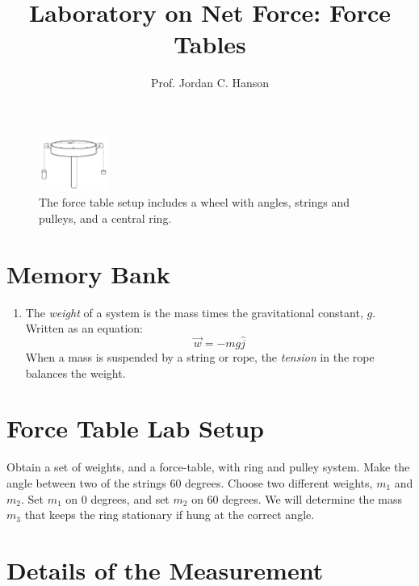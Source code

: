 \documentclass{article}
\begin{document}
\title{Laboratory on Net Force: Force Tables}
\author{Prof. Jordan C. Hanson}

\maketitle

\begin{figure}[ht]
\centering
\includegraphics[width=0.2\textwidth]{figures/Table.pdf}
\caption{\label{fig:table} The force table setup includes a wheel with angles, strings and pulleys, and a central ring.}
\end{figure}

\section{Memory Bank}

\begin{enumerate}
\item The \textit{weight} of a system is the mass times the gravitational constant, $g$.  Written as an equation:
\begin{equation}
\vec{w} = - m g \hat{j}
\end{equation}
When a mass is suspended by a string or rope, the \textit{tension} in the rope balances the weight.
\end{enumerate}

\section{Force Table Lab Setup}

Obtain a set of weights, and a force-table, with ring and pulley system.  Make the angle between two of the strings 60 degrees.  Choose two different weights, $m_1$ and $m_2$.  Set $m_1$ on 0 degrees, and set $m_2$ on 60 degrees.  We will determine the mass $m_3$ that keeps the ring stationary if hung at the correct angle.

\section{Details of the Measurement}
\end{document}

